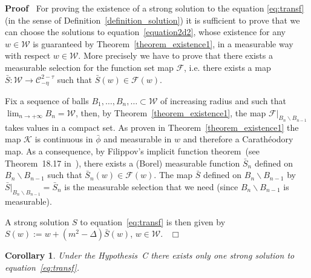 \documentclass[a4paper,10pt]{article}
\newcommand{\assign}{:=}
\newcommand{\nobracket}{}
\newenvironment{proof}{\noindent\textbf{Proof\ }}{\hspace*{\fill}$\Box$\medskip}
\newtheorem{corollary}[theorem]{Corollary}
\begin{document}
\begin{proof}
  For proving the existence of a strong solution to the equation
  {\eqref{eq:transf}} (in the sense of Definition~\ref{definition_solution})
  it is sufficient to prove that we can choose the solutions to
  equation~{\eqref{equation2d2}}, whose existence for any $w \in \mathcal{W}$
  is guaranteed by Theorem~\ref{theorem_existence1}, in a measurable way with
  respect $w \in \mathcal{W}$. More precisely we have to prove that there
  exists a measurable selection for the function set map $\mathcal{F}$, i.e.
  there exists a map $\bar{S} : \mathcal{W} \rightarrow \mathcal{C}^{2 -
  \tau}_{- \eta}$ such that $\bar{S} (w) \in \mathcal{F} (w)$.
  
  Fix a sequence of balls $B_1, \ldots, B_n, \ldots \subset \mathcal{W}$ of
  increasing radius and such that $\lim_{n \rightarrow + \infty} B_n
  =\mathcal{W}$, then, by Theorem~\ref{theorem_existence1}, the map
  $\nobracket \mathcal{F} |_{B_n \backslash B_{n - 1}}$ takes values in a
  compact set. As proven in Theorem~\ref{theorem_existence1} the map
  $\mathcal{K}$ is continuous in $\bar{\phi}$ and measurable in $w$ and
  therefore a Carath{\'e}odory map. As a consequence, by Filippov's implicit
  function theorem~(see Theorem~18.17 in~{\cite{Aliprantis2006}}), there
  exists a (Borel) measurable function $\bar{S}_n$ defined on $B_n \backslash
  B_{n - 1}$ such that $\bar{S}_n (w) \in \mathcal{F} (w)$. The map $\bar{S}$
  defined on $B_n \backslash B_{n - 1}$ by $\nobracket \bar{S} |_{B_n
  \backslash B_{n - 1}} = \bar{S}_n$ is the measurable selection that we need
  (since $B_n \backslash B_{n - 1}$ is measurable).
  
  A strong solution $S$ to equation~{\eqref{eq:transf}} is then given by $S
  (w) \assign w + (m^2 - \Delta) \bar{S} (w)$, $w \in \mathcal{W}$. \ 
\end{proof}

\begin{corollary}
  \label{corollary_uniqueness1}Under the Hypothesis~C there exists only one
  strong solution to equation~{\eqref{eq:transf}}.
\end{corollary}
\end{document}
